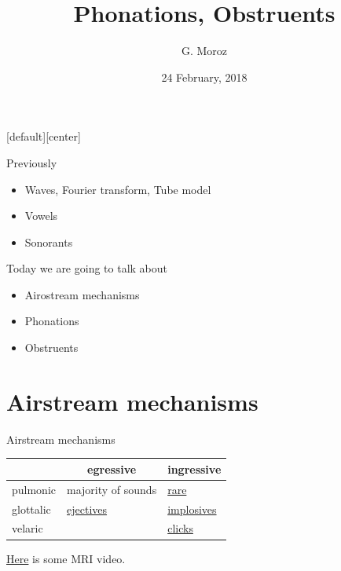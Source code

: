 
[default][center]
\title[]{Phonations, Obstruents}
\author[]{G. Moroz}
\date{24 February, 2018}

\frame{\titlepage}

\begin{frame}{Previously}
\begin{itemize}
\item Waves, Fourier transform, Tube model
\item Vowels
\item Sonorants
\end{itemize}
\pause
Today we are going to talk about
\begin{itemize}
\item Airostream mechanisms
\item Phonations
\item Obstruents
\end{itemize}

\end{frame}

\section{Airstream mechanisms}
\begin{frame}{Airstream mechanisms}
\begin{center}
\begin{tabular}{|l|l|l|}
\hline
 & \multicolumn{1}{c|}{egressive} & \multicolumn{1}{c|}{ingressive} \\ \hline
pulmonic & majority of sounds & \href{http://ingressivespeech.info/}{rare} \\ \hline
glottalic & \href{http://wals.info/feature/7A\#2/13.6/152.9}{ejectives} & \href{http://wals.info/feature/7A\#2/13.6/152.9}{implosives} \\ \hline
velaric &  & \href{https://www.youtube.com/watch?v=31zzMb3U0iY}{clicks}\\ \hline
\end{tabular}
\end{center} 

\href{http://www.seeingspeech.ac.uk/ipachart/display.php?chart=2\&datatype=1\&speaker=1}{Here} is some MRI video.
\end{frame}

